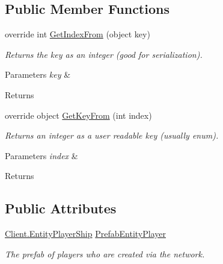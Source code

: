 \subsection*{Public Member Functions}
\begin{DoxyCompactItemize}
\item 
\hypertarget{class_skyrates_1_1_common_1_1_entity_1_1_entity_list_aa2ef8d8d41cc0bb4a105d614614c065a}{override int \hyperlink{class_skyrates_1_1_common_1_1_entity_1_1_entity_list_aa2ef8d8d41cc0bb4a105d614614c065a}{Get\-Index\-From} (object key)}\label{class_skyrates_1_1_common_1_1_entity_1_1_entity_list_aa2ef8d8d41cc0bb4a105d614614c065a}

\begin{DoxyCompactList}\small\item\em Returns the key as an integer (good for serialization). 


\begin{DoxyParams}{Parameters}
{\em key} & \\
\hline
\end{DoxyParams}
\begin{DoxyReturn}{Returns}

\end{DoxyReturn}
 \end{DoxyCompactList}\item 
\hypertarget{class_skyrates_1_1_common_1_1_entity_1_1_entity_list_a530e1a58f7f0eaddd8a5940b614b91b1}{override object \hyperlink{class_skyrates_1_1_common_1_1_entity_1_1_entity_list_a530e1a58f7f0eaddd8a5940b614b91b1}{Get\-Key\-From} (int index)}\label{class_skyrates_1_1_common_1_1_entity_1_1_entity_list_a530e1a58f7f0eaddd8a5940b614b91b1}

\begin{DoxyCompactList}\small\item\em Returns an integer as a user readable key (usually enum). 


\begin{DoxyParams}{Parameters}
{\em index} & \\
\hline
\end{DoxyParams}
\begin{DoxyReturn}{Returns}

\end{DoxyReturn}
 \end{DoxyCompactList}\end{DoxyCompactItemize}
\subsection*{Public Attributes}
\begin{DoxyCompactItemize}
\item 
\hyperlink{class_skyrates_1_1_client_1_1_entity_player_ship}{Client.\-Entity\-Player\-Ship} \hyperlink{class_skyrates_1_1_common_1_1_entity_1_1_entity_list_acd5f04c525f76e64706d7964bcbfceba}{Prefab\-Entity\-Player}
\begin{DoxyCompactList}\small\item\em The prefab of players who are created via the network. \end{DoxyCompactList}\end{DoxyCompactItemize}
